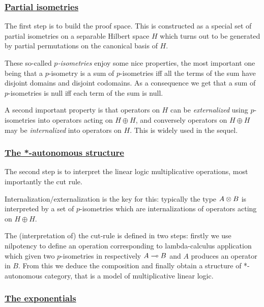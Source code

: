 \subsubsection{\texorpdfstring{\hyperref[goi-for-mell-partial-isometries]{Partial isometries}}{Partial isometries}}\label{partial-isometries}

The first step is to build the proof space. This is constructed as a
special set of partial isometries on a separable Hilbert space \(H\)
which turns out to be generated by partial permutations on the canonical
basis of \(H\).

These so-called \emph{\(p\)-isometries} enjoy some nice properties, the
most important one being that a \(p\)-isometry is a sum of
\(p\)-isometries iff all the terms of the sum have disjoint domains and
disjoint codomains. As a consequence we get that a sum of
\(p\)-isometries is null iff each term of the sum is null.

A second important property is that operators on \(H\) can be
\emph{externalized} using \(p\)-isometries into operators acting on
\(H\oplus H\), and conversely operators on \(H\oplus H\) may be
\emph{internalized} into operators on \(H\). This is widely used in the
sequel.

\subsubsection{\texorpdfstring{\hyperref[goi-for-mell-the--autonomous-structure]{The *-autonomous structure}}{The *-autonomous structure}}\label{the--autonomous-structure}

The second step is to interpret the linear logic multiplicative
operations, most importantly the cut rule.

Internalization/externalization is the key for this: typically the type
\(A\otimes B\) is interpreted by a set of \(p\)-isometries which are
internalizations of operators acting on \(H\oplus H\).

The (interpretation of) the cut-rule is defined in two steps: firstly we
use nilpotency to define an operation corresponding to lambda-calculus
application which given two \(p\)-isometries in respectively
\(A\multimap B\) and \(A\) produces an operator in \(B\). From this we
deduce the composition and finally obtain a structure of *-autonomous
category, that is a model of multiplicative linear logic.

\subsubsection{\texorpdfstring{\hyperref[goi-for-mell-exponentials]{The exponentials}}{The exponentials}}\label{the-exponentials}

